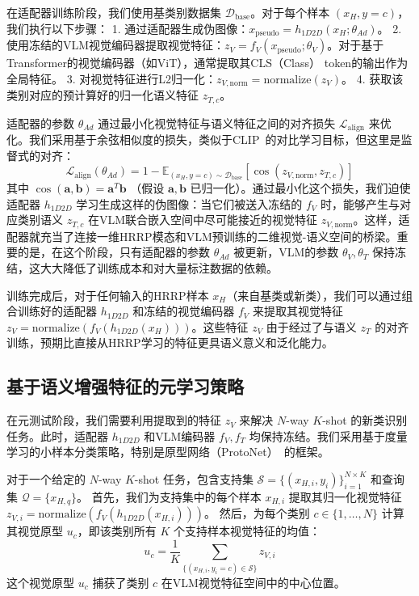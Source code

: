 在适配器训练阶段，我们使用基类别数据集 $\mathcal{D}_{\text{base}}$。对于每个样本 $(x_H, y=c)$，我们执行以下步骤：
1. 通过适配器生成伪图像：$x_{\text{pseudo}} = h_{1D2D}(x_H; \theta_{Ad})$。
2. 使用冻结的VLM视觉编码器提取视觉特征：$z_V = f_V(x_{\text{pseudo}}; \theta_V)$。对于基于Transformer的视觉编码器（如ViT），通常提取其CLS（Class） token的输出作为全局特征。
3. 对视觉特征进行L2归一化：$z_{V, \text{norm}} = \text{normalize}(z_V)$。
4. 获取该类别对应的预计算好的归一化语义特征 $z_{T,c}$。

适配器的参数 $\theta_{Ad}$ 通过最小化视觉特征与语义特征之间的对齐损失 $\mathcal{L}_{\text{align}}$ 来优化。我们采用基于余弦相似度的损失，类似于CLIP~\cite{Radford2021Learning}的对比学习目标，但这里是监督式的对齐：
\begin{equation}
    \mathcal{L}_{\text{align}}(\theta_{Ad}) = 1 - \mathbb{E}_{(x_H, y=c) \sim \mathcal{D}_{\text{base}}} \left[ \cos(z_{V, \text{norm}}, z_{T,c}) \right]
    \label{eq:adapter_align_loss_detail}
\end{equation}
其中 $\cos(\mathbf{a}, \mathbf{b}) = \mathbf{a}^T \mathbf{b}$ （假设 $\mathbf{a}, \mathbf{b}$ 已归一化）。通过最小化这个损失，我们迫使适配器 $h_{1D2D}$ 学习生成这样的伪图像：当它们被送入冻结的 $f_V$ 时，能够产生与对应类别语义 $z_{T,c}$ 在VLM联合嵌入空间中尽可能接近的视觉特征 $z_{V, \text{norm}}$。这样，适配器就充当了连接一维HRRP模态和VLM预训练的二维视觉-语义空间的桥梁。重要的是，在这个阶段，只有适配器的参数 $\theta_{Ad}$ 被更新，VLM的参数 $\theta_V, \theta_T$ 保持冻结，这大大降低了训练成本和对大量标注数据的依赖。

训练完成后，对于任何输入的HRRP样本 $x_H$（来自基类或新类），我们可以通过组合训练好的适配器 $h_{1D2D}$ 和冻结的视觉编码器 $f_V$ 来提取其视觉特征 $z_V = \text{normalize}(f_V(h_{1D2D}(x_H)))$。这些特征 $z_V$ 由于经过了与语义 $z_T$ 的对齐训练，预期比直接从HRRP学习的特征更具语义意义和泛化能力。

\subsection{基于语义增强特征的元学习策略}
\label{subsec:semantic_fsl_strategy}

在元测试阶段，我们需要利用提取到的特征 $z_V$ 来解决 $N$-way $K$-shot 的新类识别任务。此时，适配器 $h_{1D2D}$ 和VLM编码器 $f_V, f_T$ 均保持冻结。我们采用基于度量学习的小样本分类策略，特别是原型网络（ProtoNet）~\cite{Snell2017ProtoNet}的框架。

对于一个给定的 $N$-way $K$-shot 任务，包含支持集 $\mathcal{S} = \{(x_{H,i}, y_i)\}_{i=1}^{N \times K}$ 和查询集 $\mathcal{Q} = \{x_{H,q}\}$。
首先，我们为支持集中的每个样本 $x_{H,i}$ 提取其归一化视觉特征 $z_{V,i} = \text{normalize}(f_V(h_{1D2D}(x_{H,i})))$。
然后，为每个类别 $c \in \{1, \dots, N\}$ 计算其视觉原型 $u_c$，即该类别所有 $K$ 个支持样本视觉特征的均值：
\begin{equation}
    u_c = \frac{1}{K} \sum_{\{(x_{H,i}, y_i=c) \in \mathcal{S}\}} z_{V,i}
    \label{eq:visual_prototype}
\end{equation}
这个视觉原型 $u_c$ 捕获了类别 $c$ 在VLM视觉特征空间中的中心位置。

